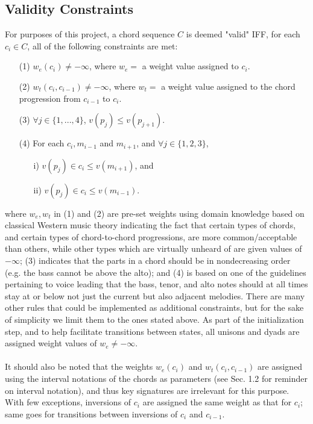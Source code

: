 \documentclass[twoside]{article}
\begin{document}
	\subsection{Validity Constraints}
	For purposes of this project, a chord sequence $C$ is deemed "valid" IFF, for each $c_i \in C$, all of the following constraints are met:
	\begin{enumerate}
		\item[(1)]
		$w_e(c_i) \neq -\infty$, where $w_e=$ a weight value assigned to $c_i$.
		\item[(2)]
		$w_t(c_i, c_{i-1}) \neq -\infty$, where $w_t=$ a weight value assigned to the chord progression from $c_{i-1}$ to $c_i$.
		\item[(3)]
		$\forall j \in \{1,...,4\}$, $v(p_j) \leq v(p_{j+1})$.
		\item[(4)]
		For each $c_i, m_{i-1}$ and $m_{i+1}$, and $\forall j \in \{1, 2, 3\}$, 
		\begin{enumerate}
			\item[i)]
			$v(p_j) \in c_i \leq v(m_{i+1})$, and
			\item[ii)]
			$v(p_j) \in c_i \leq v(m_{i-1})$.
		\end{enumerate} 
	\end{enumerate} 
	where $w_e, w_t$ in (1) and (2) are pre-set weights using domain knowledge based on classical Western music theory indicating the fact that certain types of chords, and certain types of chord-to-chord progressions, are more common/acceptable than others, while other types which are virtually unheard of are given values of $-\infty$; (3) indicates that the parts in a chord should be in nondecreasing order (e.g. the bass cannot be above the alto); and (4) is based on one of the guidelines pertaining to voice leading that the bass, tenor, and alto notes should at all times stay at or below not just the current but also adjacent melodies. There are many other rules that could be implemented as additional constraints, but for the sake of simplicity we limit them to the ones stated above. As part of the initialization step, and to help facilitate transitions between states, all unisons and dyads are assigned weight values of $w_e \neq -\infty$.
	\\\\
	It should also be noted that the weights $w_e(c_i)$ and $w_t(c_i, c_{i-1})$ are assigned using the interval notations of the chords as parameters (see Sec. 1.2 for reminder on interval notation), and thus key signatures are irrelevant for this purpose. With few exceptions, inversions of $c_i$ are assigned the same weight as that for $c_i$; same goes for transitions between inversions of $c_i$ and $c_{i-1}$.
	
\end{document}
